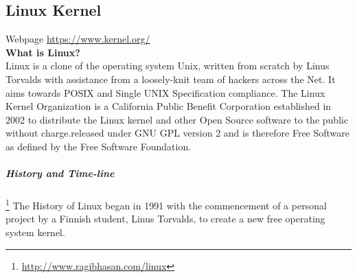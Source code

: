 \documentclass[11pt]{article} %
\begin{document}
\subsection{Linux Kernel}

Webpage \url{https://www.kernel.org/}\\
\textbf{What is Linux?}\\Linux is a clone of the operating system Unix, written from scratch by Linus Torvalds with assistance from a loosely-knit team of hackers across the Net. It aims towards POSIX and Single UNIX Specification compliance.
The Linux Kernel Organization is a California Public Benefit Corporation established in 2002 to distribute the Linux kernel and other Open Source software to the public without charge.released under GNU GPL version 2 and is therefore Free Software as defined by the Free Software Foundation.
  \subparagraph{History and Time-line}\footnote{\url{http://www.ragibhasan.com/linux}}
The History of Linux began in 1991 with the commencement of a personal project by a Finnish student, Linus Torvalds, to create a new free operating system kernel.
\end{document}
